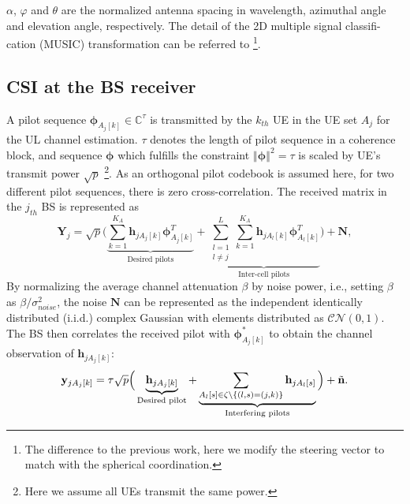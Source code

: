 $\alpha$, $\varphi$ and $\theta$ are the normalized antenna spacing in %
wavelength, azimuthal angle and elevation angle, respectively. The detail of the 2D  multiple signal classifi-
cation (MUSIC) transformation can be referred to \cite{Chen2018pilot}\footnote{The difference to the previous work, here we modify the steering vector to match with the spherical coordination.}.%

\subsection{CSI at the BS receiver}
A pilot sequence $\mathbf{\phi}_{A_j[k]}\in \mathbb{C}^{\tau} $ is transmitted by the $k_{th}$ UE in the UE set $A_j$ for the UL channel estimation. $\tau$ denotes the length of pilot sequence in a coherence block, and sequence $\mathbf{{\phi}}$ which fulfills the constraint $\left\Vert\mathbf{\phi}\right\Vert^2=\tau$ is scaled by UE's transmit power $\sqrt{p}$ \footnote{Here we assume all UEs transmit the same power. }. As an orthogonal pilot codebook is assumed here, for two different pilot sequences, there is zero cross-correlation.  The received matrix in the $j_{th}$ BS is represented as 
\begin{equation} \label{eq:Yj}
\mathbf{Y}_j = \sqrt{p}\Big(\underbrace{\sum_{k = 1}^{K_A} \mathbf{h}_{jA_j[k]} \mathbf{\phi}_{A_j[k]}^T}_\text{Desired pilots} +\underbrace{\sum_{\substack{l=1 \\ l\neq j}}^{L}\sum_{k = 1}^{K_A} \mathbf{h}_{jA_l[k]} \mathbf{\phi}_{A_l[k]}^T}_\text{Inter-cell pilots}\Big) + \mathbf{N},   
\end{equation}
By normalizing the average channel attenuation $\beta$ by noise power, i.e., setting $\beta$ as $\beta/\sigma^2_{noise}$, the noise $\mathbf{N}$ can be represented as the independent identically distributed
(i.i.d.) complex Gaussian with elements distributed as $\mathcal{CN\left(\mathit{0,1}\right)}$.
The BS then correlates the received pilot with $\mathbf{\phi}_{A_j[k]}^*$ to obtain the channel observation of $\mathbf{h}_{jA_j[k]}$:%
\begin{equation} 
\mathbf{y}_{jA_j[k]} = \tau\sqrt{p}\Big(\underbrace{\mathbf{h}_{jA_j[k]}}_\text{Desired pilot} +\underbrace{\sum_{A_l[s]\in \\ \zeta\char`\\\{(l,s) = (j,k)\}}\mathbf{h}_{jA_l[s]}}_\text{Interfering pilots}\Big) + \tilde{\mathbf{n}}.   \label{eq:pilot contamination}
\end{equation}
